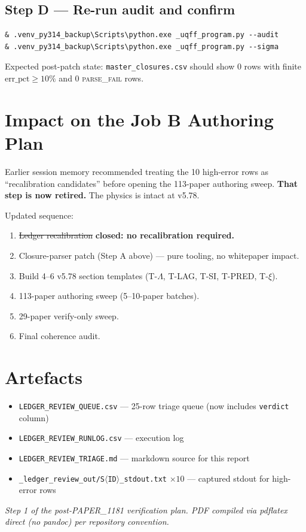 \documentclass[11pt]{article}
\begin{document}
\subsection*{Step D --- Re-run audit and confirm}
\begin{verbatim}
& .venv_py314_backup\Scripts\python.exe _uqff_program.py --audit
& .venv_py314_backup\Scripts\python.exe _uqff_program.py --sigma
\end{verbatim}
Expected post-patch state: \texttt{master\_closures.csv} should show 0 rows with finite $\mathrm{err\_pct} \ge 10\%$ and 0 \textsc{parse\_fail} rows.

\section{Impact on the Job B Authoring Plan}
Earlier session memory recommended treating the 10 high-error rows as ``recalibration candidates'' before opening the 113-paper authoring sweep. \textbf{That step is now retired.} The physics is intact at v5.78.

Updated sequence:
\begin{enumerate}
  \item \sout{Ledger recalibration} \textbf{closed: no recalibration required.}
  \item Closure-parser patch (Step A above) --- pure tooling, no whitepaper impact.
  \item Build 4--6 v5.78 section templates (T-$\Lambda$, T-LAG, T-SI, T-PRED, T-$\xi$).
  \item 113-paper authoring sweep (5--10-paper batches).
  \item 29-paper verify-only sweep.
  \item Final coherence audit.
\end{enumerate}

\section{Artefacts}
\begin{itemize}
  \item \texttt{LEDGER\_REVIEW\_QUEUE.csv} --- 25-row triage queue (now includes \texttt{verdict} column)
  \item \texttt{LEDGER\_REVIEW\_RUNLOG.csv} --- execution log
  \item \texttt{LEDGER\_REVIEW\_TRIAGE.md} --- markdown source for this report
  \item \texttt{\_ledger\_review\_out/S$\langle$ID$\rangle$\_stdout.txt} $\times 10$ --- captured stdout for high-error rows
\end{itemize}

\vspace{1em}
\noindent\textit{Step 1 of the post-PAPER\_1181 verification plan. PDF compiled via pdflatex direct (no pandoc) per repository convention.}
\end{document}
